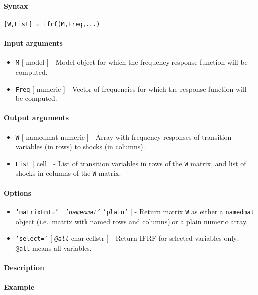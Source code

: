 


	\paragraph{Syntax}\label{syntax}

\begin{verbatim}
[W,List] = ifrf(M,Freq,...)
\end{verbatim}

\paragraph{Input arguments}\label{input-arguments}

\begin{itemize}
\item
  \texttt{M} {[} model {]} - Model object for which the frequency
  response function will be computed.
\item
  \texttt{Freq} {[} numeric {]} - Vector of frequencies for which the
  response function will be computed.
\end{itemize}

\paragraph{Output arguments}\label{output-arguments}

\begin{itemize}
\item
  \texttt{W} {[} namedmat \textbar{} numeric {]} - Array with frequency
  responses of transition variables (in rows) to shocks (in columns).
\item
  \texttt{List} {[} cell {]} - List of transition variables in rows of
  the \texttt{W} matrix, and list of shocks in columns of the \texttt{W}
  matrix.
\end{itemize}

\paragraph{Options}\label{options}

\begin{itemize}
\item
  \texttt{'matrixFmt='} {[} \emph{\texttt{'namedmat'}} \textbar{}
  \texttt{'plain'} {]} - Return matrix \texttt{W} as either a
  \href{namedmat/Contents}{\texttt{namedmat}} object (i.e.~matrix with
  named rows and columns) or a plain numeric array.
\item
  \texttt{'select='} {[} \emph{\texttt{@all}} \textbar{} char \textbar{}
  cellstr {]} - Return IFRF for selected variables only; \texttt{@all}
  means all variables.
\end{itemize}

\paragraph{Description}\label{description}

\paragraph{Example}\label{example}


